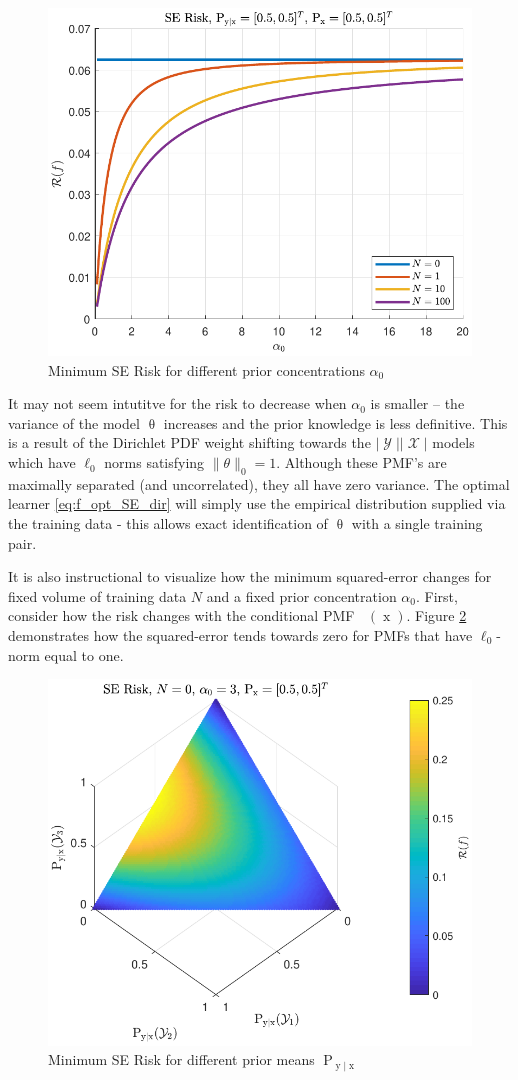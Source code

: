 \documentclass[12pt]{report}
\DeclareMathOperator{\xrm}{\mathrm{x}}
\DeclareMathOperator{\yrm}{\mathrm{y}}
\DeclareMathOperator{\Prm}{\mathrm{P}}
\DeclareMathOperator{\Xcal}{\mathcal{X}}
\DeclareMathOperator{\Ycal}{\mathcal{Y}}
\DeclareMathOperator{\alphac}{\alpha_\text{c}}
\begin{document}
\begin{figure}
\centering
\includegraphics[width=0.7\linewidth]{Risk_SE_Dir_IO_a0_leg_N.pdf}
\caption{Minimum SE Risk for different prior concentrations $\alpha_0$}
\label{fig:Risk_SE_Dir_IO_a0_leg_N}
\end{figure}

It may not seem intutitve for the risk to decrease when $\alpha_0$ is smaller -- the variance of the model $\uptheta$ increases and the prior knowledge is less definitive. This is a result of the Dirichlet PDF weight shifting towards the $|\Ycal||\Xcal|$ models which have $\ell_0$ norms satisfying $\| \theta \|_0 = 1$. Although these PMF's are maximally separated (and uncorrelated), they all have zero variance. The optimal learner \eqref{eq:f_opt_SE_dir} will simply use the empirical distribution supplied via the training data - this allows exact identification of $\uptheta$ with a single training pair.

It is also instructional to visualize how the minimum squared-error changes for fixed volume of training data $N$ and a fixed prior concentration $\alpha_0$. First, consider how the risk changes with the conditional PMF $\alphac(\xrm)$. Figure \ref{fig:Risk_SE_Dir_IO_Pyx} demonstrates how the squared-error tends towards zero for PMFs that have $\ell_0$-norm equal to one.
\begin{figure}
\centering
\includegraphics[width=0.7\linewidth]{Risk_SE_Dir_IO_Pyx.pdf}
\caption{Minimum SE Risk for different prior means $\Prm_{\yrm | \xrm}$}
\label{fig:Risk_SE_Dir_IO_Pyx}
\end{figure}
\end{document}
